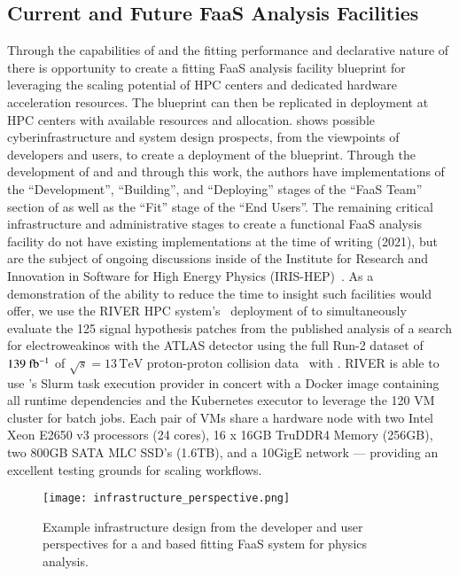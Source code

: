 \subsection{Current and Future FaaS Analysis Facilities}\label{subsec:FaaS_analysis_facilities}

Through the capabilities of \funcX{} and the fitting performance and declarative nature of \pyhf{} there is opportunity to create a fitting FaaS analysis facility blueprint for leveraging the scaling potential of HPC centers and dedicated hardware acceleration resources.
The blueprint can then be replicated in deployment at HPC centers with available resources and allocation.
 shows possible cyberinfrastructure and system design prospects, from the viewpoints of developers and users, to create a deployment of the blueprint.
Through the development of \pyhf{} and \funcX{} and through this work, the authors have implementations of the ``Development'', ``Building'', and ``Deploying'' stages of the ``FaaS Team'' section of  as well as the ``Fit'' stage of the ``End Users''.
The remaining critical infrastructure and administrative stages to create a functional FaaS analysis facility do not have existing implementations at the time of writing (2021), but are the subject of ongoing discussions inside of the Institute for Research and Innovation in Software for High Energy Physics (IRIS-HEP)~\cite{IRIS-HEP:NSF-proposal}.
As a demonstration of the ability to reduce the time to insight such facilities would offer, we use the RIVER HPC system's~\cite{RIVER_HPC} deployment of \funcX{} to simultaneously evaluate the 125 signal hypothesis patches from the published analysis of a search for electroweakinos with the ATLAS detector using the full Run-2 dataset of \(139~\ifb\) of \(\sqrt{s} = 13\,\text{TeV}\) proton-proton collision data~\cite{SUSY-2019-08} with \pyhf{}.
RIVER is able to use \funcX{}'s Slurm task execution provider in concert with a Docker image containing all runtime dependencies and the Kubernetes \funcX{} executor to leverage the 120 VM cluster for batch jobs.
Each pair of VMs share a hardware node with two Intel Xeon E2650 v3 processors (24 cores), 16 x 16GB TruDDR4 Memory (256GB), two 800GB SATA MLC SSD's (1.6TB), and a 10GigE network --- providing an excellent testing grounds for scaling workflows.

\begin{figure}[!htpb]
    \centering
    \texttt{[image: infrastructure\_perspective.png]}
    \caption{Example infrastructure design from the developer and user perspectives for a \pyhf{} and \funcX{} based fitting FaaS system for physics analysis.~\cite{portable_inference_workshop}}
    \label{fig:infrastructure_perspective}
\end{figure}
